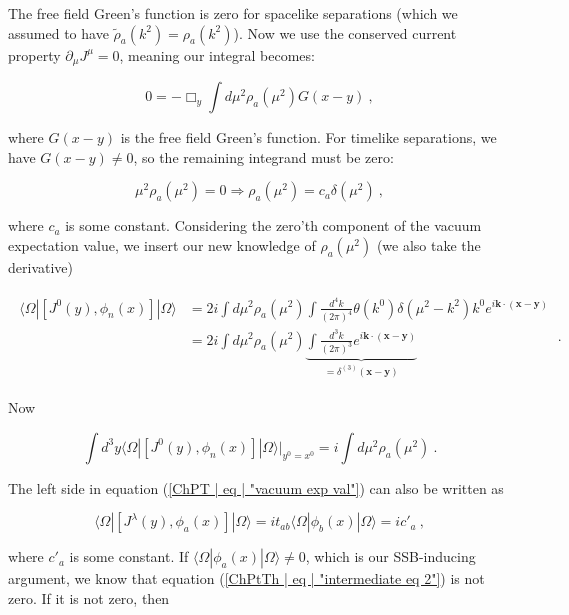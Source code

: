\documentclass[10pt,twoside]{report}
\begin{document}
	The free field Green's function is zero for spacelike separations (which we assumed to have $\tilde{\rho}_a(k^2) = \rho_a(k^2)$). Now we use the conserved current property $\partial_\mu J^\mu = 0$, meaning our integral becomes:
	
	\begin{equation}
			0 = -\Box_y \int d\mu^2\rho_a(\mu^2)G(x-y) \:,
	\end{equation}
	
	\noindent where $G(x-y)$ is the free field Green's function. For timelike separations, we have $G(x-y)\neq 0$, so the remaining integrand must be zero:
	
	\begin{equation}
		\mu^2\rho_a(\mu^2) = 0 \Rightarrow \rho_a(\mu^2) = c_a\delta(\mu^2) \:,
	\end{equation}
	
	\noindent where $c_a$ is some constant. Considering the zero'th component of the vacuum expectation value, we insert our new knowledge of $\rho_a(\mu^2)$ (we also take the derivative)
	
	\begin{align}
		\begin{split}
		\langle\Omega|[J^0(y),\phi_n(x)]|\Omega\rangle &= 2i\int d\mu^2\rho_a(\mu^2)\int\frac{d^4k}{(2\pi)^4}\theta(k^0)\delta(\mu^2-k^2)k^0e^{i\bm{k}\cdot(\bm{x}-\bm{y})} \\
		&= 2i\int d\mu^2\rho_a(\mu^2)\underbrace{\int\frac{d^3k}{(2\pi)^3}e^{i\bm{k}\cdot(\bm{x}-\bm{y})}}_{=\delta^{(3)}(\bm{x}-\bm{y})}
		\end{split} \:.
	\end{align}
	
	Now
	
	\begin{equation}
		\int d^3y\langle\Omega|[J^0(y),\phi_n(x)]|\Omega\rangle\Big|_{y^0=x^0} = i\int d\mu^2\rho_a(\mu^2) \:.
		\label{ChPtTh | eq | "intermediate eq 2"}
	\end{equation}
	
	The left side in equation (\ref{ChPT | eq | "vacuum exp val"}) can also be written as
	
	\begin{equation}
		\langle\Omega|[J^\lambda(y),\phi_a(x)]|\Omega\rangle = it_{ab}\langle\Omega|\phi_b(x)|\Omega\rangle = ic'_a \:,
		\label{ChPtTh | eq | "intermediate eq 3"}
	\end{equation}
	
	\noindent where $c'_a$ is some constant. If $\langle\Omega|\phi_a(x)|\Omega\rangle\neq 0$, which is our SSB-inducing argument, we know that equation (\ref{ChPtTh | eq | "intermediate eq 2"}) is not zero. If it is not zero, then
	
\end{document}
